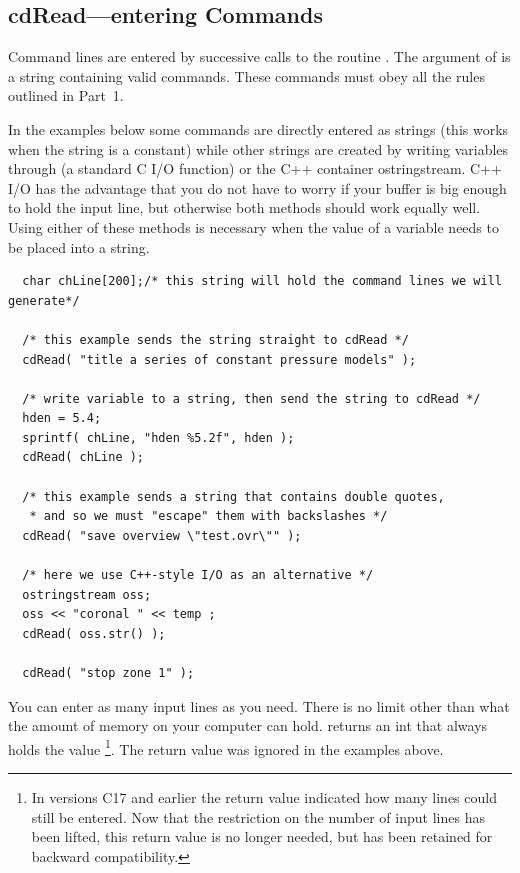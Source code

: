 \subsection{cdRead---entering Commands}

Command lines are entered by successive calls to the routine .  The
argument of  is a string containing valid commands.
These commands must obey all the rules outlined in Part~1.

In the examples below some commands are directly entered as strings (this
works when the string is a constant) while other strings are created by
writing variables through  (a standard C I/O function) or
the C++ container ostringstream. C++ I/O has the advantage that you do not
have to worry if your buffer is big enough to hold the input line, but
otherwise both methods should work equally well. Using either of these methods
is necessary when the value of a variable needs to be placed into a string.
\begin{verbatim}
  char chLine[200];/* this string will hold the command lines we will generate*/

  /* this example sends the string straight to cdRead */
  cdRead( "title a series of constant pressure models" );

  /* write variable to a string, then send the string to cdRead */
  hden = 5.4;
  sprintf( chLine, "hden %5.2f", hden );
  cdRead( chLine );

  /* this example sends a string that contains double quotes,
   * and so we must "escape" them with backslashes */
  cdRead( "save overview \"test.ovr\"" );

  /* here we use C++-style I/O as an alternative */
  ostringstream oss;
  oss << "coronal " << temp ;
  cdRead( oss.str() );

  cdRead( "stop zone 1" );
\end{verbatim}

You can enter as many input lines as you need. There is no limit other than
what the amount of memory on your computer can hold. 
returns an int that always holds the value 
\footnote{In versions C17 and earlier the return value indicated how many
  lines could still be entered. Now that the restriction on the number of
  input lines has been lifted, this return value is no longer needed, but has
  been retained for backward compatibility.}. The return value was ignored in
the examples above.

